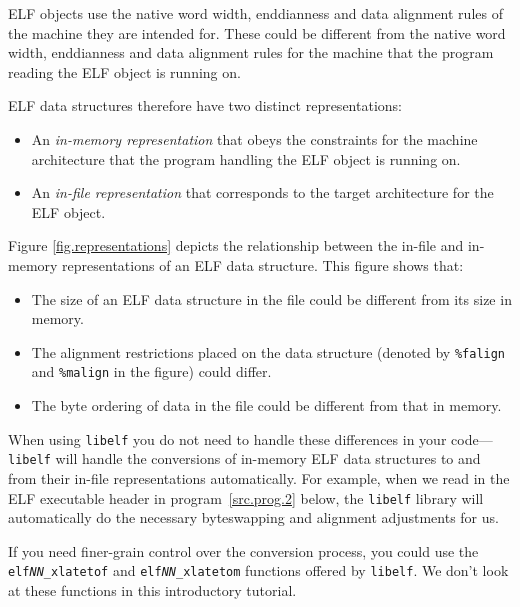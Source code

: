 \documentclass[a4paper,pdftex]{book}
\newcommand{\code}[1]{\texttt{#1}}
\newcommand{\library}[1]{\texttt{#1}}
\begin{document}
ELF objects use the native word width, enddianness and data alignment
rules of the machine they are intended for.  These could be different
from the native word width, enddianness and data alignment rules for
the machine that the program reading the ELF object is running on.

ELF data structures therefore have two distinct
representations:

\begin{itemize}
\item An \emph{in-memory representation} that obeys the constraints
  for the machine architecture that the program handling the ELF
  object is running on.
\item An \emph{in-file representation} that corresponds to the target
  architecture for the ELF object.
\end{itemize}

Figure \vref{fig.representations} depicts the relationship between the
in-file and in-memory representations of an ELF data structure.  This
figure shows that:

\begin{itemize}
\item The size of an ELF data structure in the file could be different
  from its size in memory.
\item The alignment restrictions placed on the data structure (denoted
  by \code{\%falign} and \code{\%malign} in the figure)
  could differ.
\item The byte ordering of data in the file could be different
  from that in memory.
\end{itemize}

When using \library{libelf} you do not need to handle these
differences in your code---\library{libelf} will handle the
conversions of in-memory ELF data structures to and from their in-file
representations automatically.  For example, when we read in the ELF
executable header in program~\vref{src.prog.2} below, the
\library{libelf} library will automatically do the necessary
byteswapping and alignment adjustments for us.%
%

If you need finer-grain control over the conversion process, you could
use the \code{elf\textit{NN}\_xlatetof} and
\code{elf\textit{NN}\_xlatetom} functions offered by \library{libelf}.
 We don't look at
these functions in this introductory tutorial.
\end{document}
